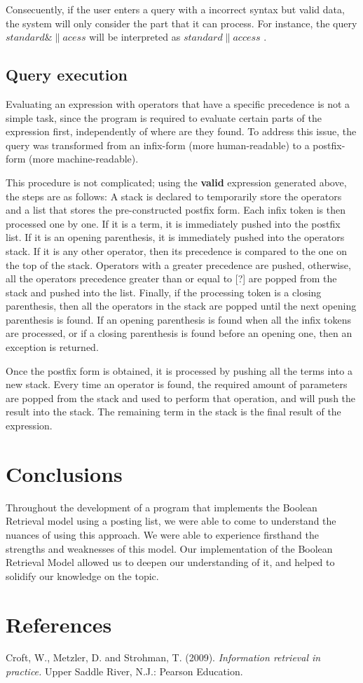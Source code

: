 \documentclass{article}
\begin{document}
Consecuently, if the user enters a query with a incorrect syntax but valid data, the system will only consider the part that it can process. For instance, the query $standard \&\| acess$ will be interpreted as $standard \| access$ .

\subsection*{Query execution}
Evaluating an expression with operators that have a specific precedence is not a simple task, since the program is required to evaluate certain parts of the expression first, independently of where are they found. To address this issue, the query was transformed from an infix-form (more human-readable) to a postfix-form (more machine-readable).

This procedure is not complicated; using the \textbf{valid} expression generated above, the steps are as follows:
A stack is declared to temporarily store the operators and a list that stores the pre-constructed postfix form. Each infix token is then processed one by one. If it is a term, it is immediately pushed into the postfix list. If it is an opening parenthesis, it is immediately pushed into the operators stack. If it is any other operator, then its precedence is compared to the one on the top of the stack. Operators with a greater precedence are pushed, otherwise, all the operators precedence greater than or equal to [?] are popped from the stack and pushed into the list. Finally, if the processing token is a closing parenthesis, then all the operators in the stack are popped until the next opening parenthesis is found. If an opening parenthesis is found when all the infix tokens are processed, or if a closing parenthesis is found before an opening one, then an exception is returned.

Once the postfix form is obtained, it is processed by pushing all the terms into a new stack. Every time an operator is found, the required amount of parameters are popped from the stack and used to perform that operation, and will push the result into the stack. The remaining term in the stack is the final result of the expression.

\section{Conclusions}
Throughout the development of a program that implements the Boolean Retrieval model using a posting list, we were able to come to understand the nuances of using this approach.
We were able to experience firsthand the strengths and weaknesses of this model.
Our implementation of the Boolean Retrieval Model allowed us to deepen our understanding of it, and helped to solidify our knowledge on the topic.

\section{References}
Croft, W., Metzler, D. and Strohman, T. (2009). \textit{Information retrieval in practice.} Upper Saddle River, N.J.: Pearson Education.

\end{document}
